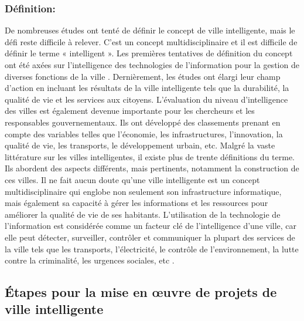 \documentclass[french, a4paper, 12pt]{report}
\begin{document}
\subsubsection{Définition:}
De nombreuses études ont tenté de définir le concept de ville intelligente, mais le défi reste difficile à relever. C’est un concept multidisciplinaire et il est difficile de définir le terme « intelligent ». Les premières tentatives de définition du concept ont été axées sur l'intelligence des technologies de l'information pour la gestion de diverses fonctions de la ville \cite{3}. 
Dernièrement, les études ont élargi leur champ d'action en incluant les résultats de la ville intelligente tels que la durabilité, la qualité de vie et les services aux citoyens.
L'évaluation du niveau d'intelligence des villes est également devenue importante pour les chercheurs et les responsables gouvernementaux. Ils ont développé des classements prenant en compte des variables telles que l'économie, les infrastructures, l'innovation, la qualité de vie, les transports, le développement urbain, etc.
Malgré la vaste littérature sur les villes intelligentes, il existe plus de trente définitions du terme. Ils abordent des aspects différents, mais pertinents, notamment la construction de ces villes. 
Il ne fait aucun doute qu'une ville intelligente est un concept multidisciplinaire qui englobe non seulement son infrastructure informatique, mais également sa capacité à gérer les informations et les ressources pour améliorer la qualité de vie de ses habitants. L'utilisation de la technologie de l'information est considérée comme un facteur clé de l'intelligence d'une ville, car elle peut détecter, surveiller, contrôler et communiquer la plupart des services de la ville tels que les transports, l'électricité, le contrôle de l'environnement, la lutte contre la criminalité, les urgences sociales, etc \cite{4}.

\subsection{Étapes pour la mise en œuvre de projets de ville intelligente}
\end{document}
